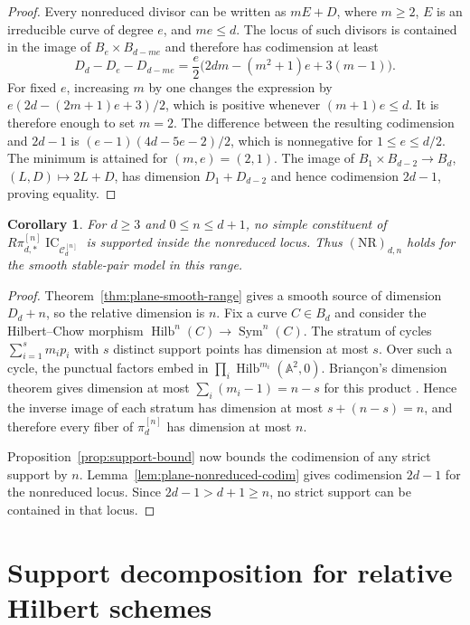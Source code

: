 \documentclass[11pt,reqno]{amsart}
\newtheorem{corollary}[theorem]{Corollary}
\theoremstyle{definition}
\newcommand{\IC}{\operatorname{IC}}
\newcommand{\Hilb}{\operatorname{Hilb}}
\begin{document}
\begin{proof}
Every nonreduced divisor can be written as $mE+D$, where $m\ge2$, $E$ is an
irreducible curve of degree $e$, and $me\le d$.  The locus of such divisors
is contained in the image of $B_e\times B_{d-me}$ and therefore has
codimension at least
\[
 D_d-D_e-D_{d-me}
 =\frac e2\bigl(2dm-(m^2+1)e+3(m-1)\bigr).
\]
For fixed $e$, increasing $m$ by one changes the expression by
$e(2d-(2m+1)e+3)/2$, which is positive whenever $(m+1)e\le d$.
It is therefore enough to set $m=2$.  The difference between the resulting
codimension and $2d-1$ is
$(e-1)(4d-5e-2)/2$, which is nonnegative for $1\le e\le d/2$.
The minimum is attained for $(m,e)=(2,1)$.  The image of
$B_1\times B_{d-2}\to B_d$, $(L,D)\mapsto2L+D$, has dimension
$D_1+D_{d-2}$ and hence codimension $2d-1$, proving equality.
\end{proof}

\begin{corollary}\label{cor:plane-nonreduced}
For $d\ge3$ and $0\le n\le d+1$, no simple constituent of
$R\pi_{d,*}^{[n]}\IC_{\mathcal C_d^{[n]}}$
is supported inside the nonreduced locus.  Thus
$(\mathrm{NR})_{d,n}$ holds for the smooth stable-pair model in this range.
\end{corollary}

\begin{proof}
Theorem~\ref{thm:plane-smooth-range} gives a smooth source of dimension
$D_d+n$, so the relative dimension is $n$.  Fix a curve $C\in B_d$ and
consider the Hilbert--Chow morphism
$\Hilb^n(C)\to\operatorname{Sym}^n(C)$.  The stratum of cycles
$\sum_{i=1}^s m_ip_i$ with $s$ distinct support points has dimension at most
$s$.  Over such a cycle, the punctual factors embed in
$\prod_i\Hilb^{m_i}(\mathbb A^2,0)$.  Brian\c{c}on's dimension theorem gives
dimension at most $\sum_i(m_i-1)=n-s$ for this product
\cite{Briancon}.  Hence the inverse image of each stratum has dimension at
most $s+(n-s)=n$, and therefore every fiber of $\pi_d^{[n]}$ has dimension
at most $n$.

Proposition~\ref{prop:support-bound} now bounds the codimension of any strict
support by $n$.  Lemma~\ref{lem:plane-nonreduced-codim} gives codimension
$2d-1$ for the nonreduced locus.  Since $2d-1>d+1\ge n$, no strict support
can be contained in that locus.
\end{proof}

\section{Support decomposition for relative Hilbert schemes}
\label{sec:hilbert}
\end{document}
